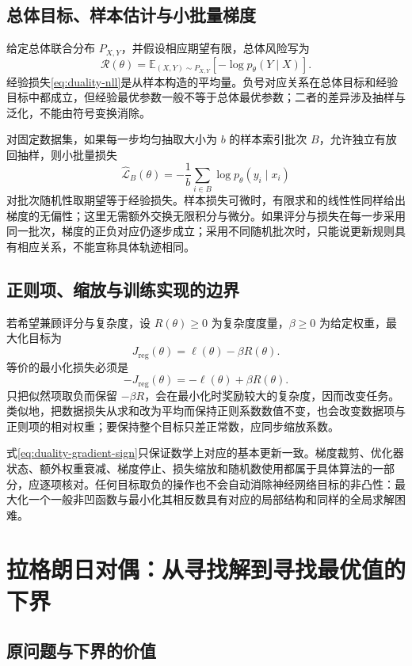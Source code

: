 \documentclass[UTF8]{ctexart}
\begin{document}
\subsection{总体目标、样本估计与小批量梯度}

给定总体联合分布 $P_{X,Y}$，并假设相应期望有限，总体风险写为
\[
 \mathcal R(\theta)=\mathbb E_{(X,Y)\sim P_{X,Y}}
 [-\log p_\theta(Y\mid X)].
\]
经验损失\eqref{eq:duality-nll}是从样本构造的平均量。负号对应关系在总体目标和经验目标中都成立，但经验最优参数一般不等于总体最优参数；二者的差异涉及抽样与泛化，不能由符号变换消除。

对固定数据集，如果每一步均匀抽取大小为 $b$ 的样本索引批次 $B$，允许独立有放回抽样，则小批量损失
\[
 \widehat{\mathcal L}_B(\theta)
 =-\frac1b\sum_{i\in B}\log p_\theta(y_i\mid x_i)
\]
对批次随机性取期望等于经验损失。样本损失可微时，有限求和的线性性同样给出梯度的无偏性；这里无需额外交换无限积分与微分。如果评分与损失在每一步采用同一批次，梯度的正负对应仍逐步成立；采用不同随机批次时，只能说更新规则具有相应关系，不能宣称具体轨迹相同。

\subsection{正则项、缩放与训练实现的边界}

若希望兼顾评分与复杂度，设 $R(\theta)\geq0$ 为复杂度度量，$\beta\geq0$ 为给定权重，最大化目标为
\[
 J_{\mathrm{reg}}(\theta)=\ell(\theta)-\beta R(\theta).
\]
等价的最小化损失必须是
\begin{equation}
 -J_{\mathrm{reg}}(\theta)=-\ell(\theta)+\beta R(\theta).
 \label{eq:duality-regularization-sign}
\end{equation}
只把似然项取负而保留 $-\beta R$，会在最小化时奖励较大的复杂度，因而改变任务。类似地，把数据损失从求和改为平均而保持正则系数数值不变，也会改变数据项与正则项的相对权重；要保持整个目标只差正常数，应同步缩放系数。

式\eqref{eq:duality-gradient-sign}只保证数学上对应的基本更新一致。梯度裁剪、优化器状态、额外权重衰减、梯度停止、损失缩放和随机数使用都属于具体算法的一部分，应逐项核对。任何目标取负的操作也不会自动消除神经网络目标的非凸性：最大化一个一般非凹函数与最小化其相反数具有对应的局部结构和同样的全局求解困难。

\section{拉格朗日对偶：从寻找解到寻找最优值的下界}
\label{sec:duality-lagrange}

\subsection{原问题与下界的价值}
\end{document}
